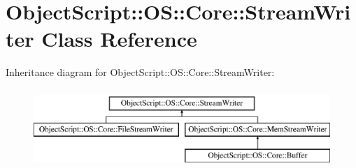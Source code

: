 \hypertarget{class_object_script_1_1_o_s_1_1_core_1_1_stream_writer}{}\section{Object\+Script\+:\+:OS\+:\+:Core\+:\+:Stream\+Writer Class Reference}
\label{class_object_script_1_1_o_s_1_1_core_1_1_stream_writer}
Inheritance diagram for Object\+Script\+:\+:OS\+:\+:Core\+:\+:Stream\+Writer\+:\begin{figure}[H]
\begin{center}
\leavevmode
\includegraphics[height=3.000000cm]{class_object_script_1_1_o_s_1_1_core_1_1_stream_writer}
\end{center}
\end{figure}
